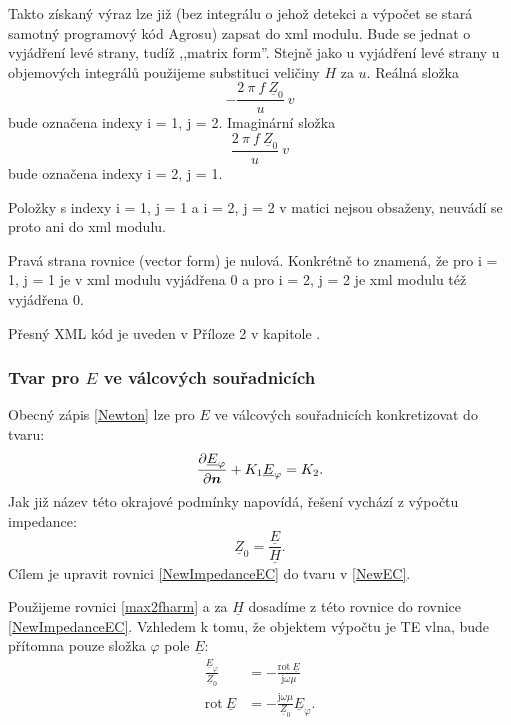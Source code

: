 \documentclass[12pt,a4paper,oneside]{article}
\numberwithin{equation}{section} %
\numberwithin{figure}{section} %
\numberwithin{table}{section} %
\newcommand{\mj}{\mathrm{j}} %
\renewcommand{\vec}[1]{\mbox{\boldmath$#1$}} %
\newcommand{\faz}[1]{{\underline{#1}}} %
\newcommand{\rot}{\mathrm{rot}\ }
\begin{document}
Takto získaný výraz lze již (bez integrálu o jehož detekci a výpočet se stará samotný programový kód Agrosu) zapsat do xml modulu. Bude se jednat o vyjádření levé strany, tudíž ,,matrix form''. Stejně jako u vyjádření levé strany u objemových integrálů použijeme substituci veličiny $H$ za $u$. Reálná složka 
\begin{equation}
- \frac{2 ~ \pi ~ f ~ \faz{Z} _0}{u} ~ v
\end{equation} 
bude označena indexy i = 1, j = 2. Imaginární složka 
\begin{equation}
\frac{2 ~ \pi ~ f ~ \faz{Z} _0}{u} ~ v
\end{equation}
bude označena indexy i = 2, j = 1.

Položky s indexy i = 1, j = 1 a i = 2, j = 2 v matici nejsou obsaženy, neuvádí se proto ani do xml modulu.

Pravá strana rovnice (vector form) je nulová. Konkrétně to znamená, že pro i = 1, j = 1 je v xml modulu vyjádřena $0$ a pro i = 2, j = 2 je xml modulu též vyjádřena $0$.

Přesný XML kód je uveden v Příloze 2 v kapitole .



\subsubsection*{Tvar pro \faz{\vec{E}} ve válcových souřadnicích}
Obecný zápis \ref{Newton} lze pro \faz{\vec{E}} ve válcových souřadnicích konkretizovat do tvaru:
\begin{equation}
\label{NewEC}
\frac{\partial \faz{E} _{\varphi}}{\partial \vec{n}} + K_1 \faz{E} _{\varphi} = K_2 .
\end{equation}
Jak již název této okrajové podmínky napovídá, řešení vychází z výpočtu impedance: 
\begin{equation}
\label{NewImpedanceEC}
\faz{Z} _0 = \frac{\faz{E}}{\faz{H}} .
\end{equation}
Cílem je upravit rovnici \ref{NewImpedanceEC} do tvaru v \ref{NewEC}.

Použijeme rovnici \ref{max2fharm} a za $\faz{H}$ dosadíme z této rovnice do rovnice \ref{NewImpedanceEC}. Vzhledem k tomu, že objektem výpočtu je TE vlna, bude přítomna pouze složka ${\varphi}$ pole $\faz{E}$:
\begin{subequations}
\begin{align}
\frac{\faz{E} _{\varphi}}{\faz{Z} _0} &= - \frac{\rot \! \faz{E}}{\mj \omega \mu}
\\
\rot \! \faz{E} &= - \frac{\mj \omega \mu}{\faz{Z} _0} \faz{E} _{\varphi} .
\end{align}
\end{subequations}
\end{document}
